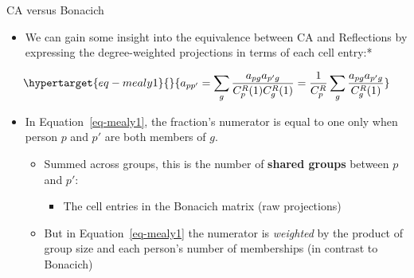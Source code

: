 \documentclass[
  ignorenonframetext,
]{beamer}
\providecommand{\tightlist}{%
  \setlength{\itemsep}{0pt}\setlength{\parskip}{0pt}}\usepackage{longtable,booktabs,array}
\begin{document}
\begin{frame}{CA versus Bonacich}
\protect\hypertarget{ca-versus-bonacich-3}{}
\begin{itemize}
\tightlist
\item
  We can gain some insight into the equivalence between CA and
  Reflections by expressing the degree-weighted projections in terms of
  each cell entry:*
\end{itemize}

\begin{equation}\protect\hypertarget{eq-mealy1}{}{
a_{pp'} = \sum_g\frac{a_{pg}a_{p'g}}{C^R_p(1)C^R_g(1)} = 
    \frac{1}{C^R_p}\sum_g\frac{a_{pg}a_{p'g}}{C^R_g(1)}
}\label{eq-mealy1}\end{equation}

\begin{itemize}
\item
  In Equation~\ref{eq-mealy1}, the fraction's numerator is equal to one
  only when person \(p\) and \(p'\) are both members of \(g\).

  \begin{itemize}
  \tightlist
  \item
    Summed across groups, this is the number of \textbf{shared groups}
    between \(p\) and \(p'\):

    \begin{itemize}
    \tightlist
    \item
      The cell entries in the Bonacich matrix (raw projections)
    \end{itemize}
  \item
    But in Equation~\ref{eq-mealy1} the numerator is \emph{weighted} by
    the product of group size and each person's number of memberships
    (in contrast to Bonacich)
  \end{itemize}
\end{itemize}

\end{frame}
\end{document}
